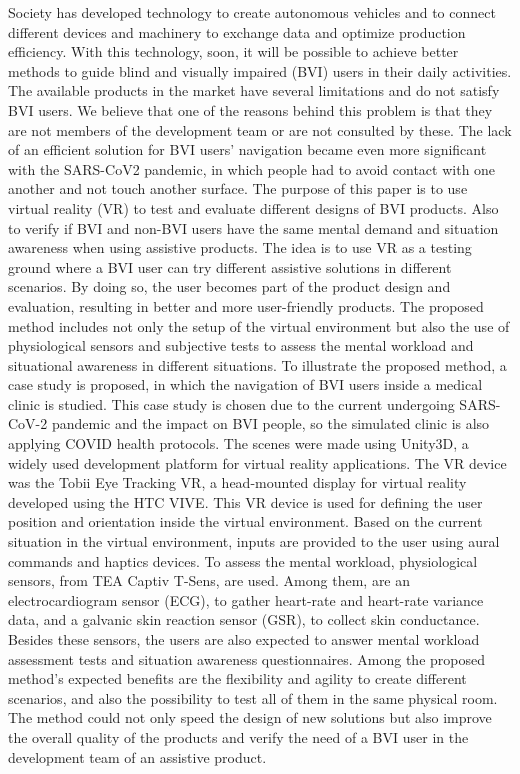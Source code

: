 Society has developed technology to create autonomous vehicles and to connect different devices and machinery to exchange data and optimize production efficiency.  With this technology, soon, it will be possible to achieve better methods to guide blind and visually impaired (BVI) users in their daily activities. The available products in the market have several limitations and do not satisfy BVI users. We believe that one of the reasons behind this problem is that they are not members of the development team or are not consulted by these. 
The lack of an efficient solution for BVI users' navigation became even more significant with the SARS-CoV2 pandemic, in which people had to avoid contact with one another and not touch another surface.
The purpose of this paper is to use virtual reality (VR) to test and evaluate different designs of BVI products. Also to verify if BVI and non-BVI users have the same mental demand and situation awareness when using assistive products. The idea is to use VR as a testing ground where a BVI user can try different assistive solutions in different scenarios. By doing so, the user becomes part of the product design and evaluation, resulting in better and more user-friendly products. The proposed method includes not only the setup of the virtual environment but also the use of physiological sensors and subjective tests to assess the mental workload and situational awareness in different situations.
To illustrate the proposed method, a case study is proposed, in which the navigation of BVI users inside a medical clinic is studied. This case study is chosen due to the current undergoing SARS-CoV-2 pandemic and the impact on BVI people, so the simulated clinic is also applying COVID health protocols.
The scenes were made using Unity3D, a widely used development platform for virtual reality applications. The VR device was the Tobii Eye Tracking VR, a head-mounted display for virtual reality developed using the HTC VIVE. This VR device is used for defining the user position and orientation inside the virtual environment. Based on the current situation in the virtual environment, inputs are provided to the user using aural commands and haptics devices. To assess the mental workload, physiological sensors, from TEA Captiv T-Sens, are used. Among them, are an electrocardiogram sensor (ECG), to gather heart-rate and heart-rate variance data, and a galvanic skin reaction sensor (GSR), to collect skin conductance. Besides these sensors, the users are also expected to answer mental workload assessment tests and situation awareness questionnaires.
Among the proposed method's expected benefits are the flexibility and agility to create different scenarios, and also the possibility to test all of them in the same physical room. The method could not only speed the design of new solutions but also improve the overall quality of the products and verify the need of a BVI user in the development team of an assistive product.